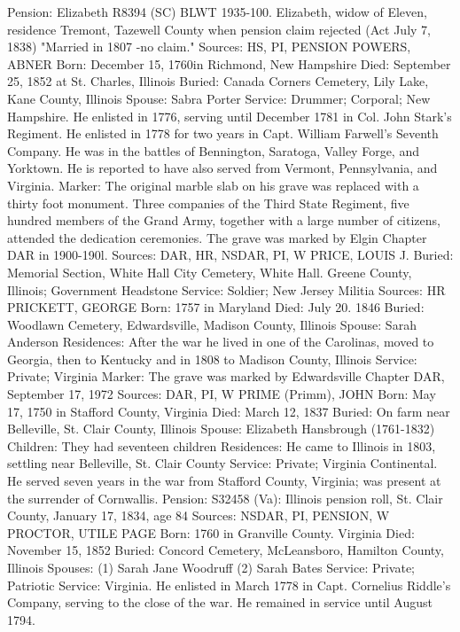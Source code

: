 Pension: Elizabeth R8394 (SC) BLWT 1935-100. Elizabeth, widow of Eleven, resi­dence Tremont, Tazewell County when pension claim rejected (Act July 7, 1838) "Married in 1807 -no claim." 
Sources: HS, PI, PENSION 
POWERS, ABNER
Born: December 15, 1760in Richmond, New Hampshire
Died: September 25, 1852 at St. Charles, Illinois
Buried: Canada Corners Cemetery, Lily Lake, Kane County, Illinois 
Spouse: Sabra Porter 
Service: Drummer; Corporal; New Hampshire. He enlisted in 1776, serving until December 1781 in Col. John Stark's Regiment. He enlisted in 1778 for two years in Capt. William Farwell's Seventh Company. He was in the battles of Bennington, Saratoga, Valley Forge, and Yorktown. He is reported to have also served from Vermont, Pennsylvania, and Virginia. 
Marker: The original marble slab on his grave was replaced with a thirty foot monument. Three companies of the Third State Regiment, five hundred members of the Grand Army, together with a large number of citizens, attended the dedication ceremonies. The grave was marked by Elgin Chapter DAR in 1900-190l. 
Sources: DAR, HR, NSDAR, PI, W 
PRICE, LOUIS J. 
Buried: Memorial Section, White Hall City Cemetery, White Hall. Greene County, 
Illinois; Government Headstone
Service: Soldier; New Jersey Militia 
Sources: HR 
PRICKETT, GEORGE
Born: 1757 in Maryland
Died: July 20. 1846
Buried: Woodlawn Cemetery, Edwardsville, Madison County, Illinois 
Spouse: Sarah Anderson
Residences: After the war he lived in one of the Carolinas, moved to Georgia, then to Kentucky and in 1808 to Madison County, Illinois
Service: Private; Virginia
Marker: The grave was marked by Edwardsville Chapter DAR, September 17, 1972
Sources: DAR, PI, W 
PRIME (Primm), JOHN
Born: May 17, 1750 in Stafford County, Virginia
Died: March 12, 1837
Buried: On farm near Belleville, St. Clair County, Illinois 
Spouse: Elizabeth Hansbrough (1761-1832) 
Children: They had seventeen children
Residences: He came to Illinois in 1803, settling near Belleville, St. Clair County
Service: Private; Virginia Continental. He served seven years in the war from Stafford County, Virginia; was present at the surrender of Cornwallis. 
Pension: S32458 (Va): Illinois pension roll, St. Clair County, January 17, 1834, age 84 
Sources: NSDAR, PI, PENSION, W 
PROCTOR, UTILE PAGE 
Born: 1760 in Granville County. Virginia 
Died: November 15, 1852 
Buried: Concord Cemetery, McLeansboro, Hamilton County, Illinois 
Spouses: (1) Sarah Jane Woodruff 
	 (2) Sarah Bates 
Service: Private; Patriotic
Service: Virginia. He enlisted in March 1778 in Capt. Cornelius Riddle's Company, serving to the close of the war. He remained in service until August 1794. 

